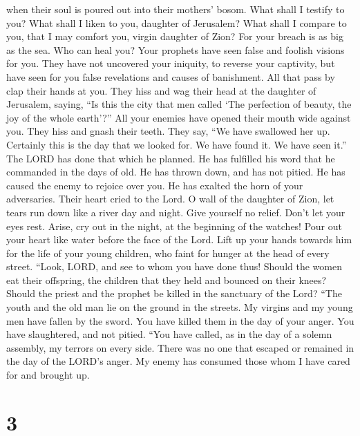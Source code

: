 when their soul is poured out into their mothers' bosom. 
What shall I testify to you? What shall I liken to you, daughter of
Jerusalem? What shall I compare to you, that I may comfort you, virgin
daughter of Zion? For your breach is as big as the sea. Who can heal
you?  Your prophets have seen false and foolish visions
for you. They have not uncovered your iniquity, to reverse your
captivity, but have seen for you false revelations and causes of
banishment.  All that pass by clap their hands at you.
They hiss and wag their head at the daughter of Jerusalem, saying, ``Is
this the city that men called `The perfection of beauty, the joy of the
whole earth'?''  All your enemies have opened their mouth
wide against you. They hiss and gnash their teeth. They say, ``We have
swallowed her up. Certainly this is the day that we looked for. We have
found it. We have seen it.''  The LORD has done that
which he planned. He has fulfilled his word that he commanded in the
days of old. He has thrown down, and has not pitied. He has caused the
enemy to rejoice over you. He has exalted the horn of your adversaries.
 Their heart cried to the Lord. O wall of the daughter of
Zion, let tears run down like a river day and night. Give yourself no
relief. Don't let your eyes rest.  Arise, cry out in the
night, at the beginning of the watches! Pour out your heart like water
before the face of the Lord. Lift up your hands towards him for the life
of your young children, who faint for hunger at the head of every
street.  ``Look, LORD, and see to whom you have done
thus! Should the women eat their offspring, the children that they held
and bounced on their knees? Should the priest and the prophet be killed
in the sanctuary of the Lord?  ``The youth and the old
man lie on the ground in the streets. My virgins and my young men have
fallen by the sword. You have killed them in the day of your anger. You
have slaughtered, and not pitied.  ``You have called, as
in the day of a solemn assembly, my terrors on every side. There was no
one that escaped or remained in the day of the LORD's anger. My enemy
has consumed those whom I have cared for and brought up.

\hypertarget{section-2}{%
\section{3}\label{section-2}}


